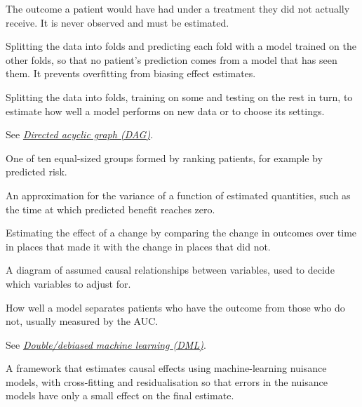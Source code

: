 \begin{description}[style=nextline, leftmargin=1.2em, itemsep=3pt, font=\normalfont\bfseries]
\item[Counterfactual (potential outcome)]
The outcome a patient would have had under a treatment they did not actually receive. It is never observed and must be estimated.

\item[Cross-fitting]
Splitting the data into folds and predicting each fold with a model trained on the other folds, so that no patient's prediction comes from a model that has seen them. It prevents overfitting from biasing effect estimates.

\item[Cross-validation]
Splitting the data into folds, training on some and testing on the rest in turn, to estimate how well a model performs on new data or to choose its settings.

\item[DAG]
See \emph{\hyperref[gl:dag]{Directed acyclic graph (DAG)}}.

\item[Decile]
One of ten equal-sized groups formed by ranking patients, for example by predicted risk.

\item[Delta method]
An approximation for the variance of a function of estimated quantities, such as the time at which predicted benefit reaches zero.

\item[Difference-in-differences]
Estimating the effect of a change by comparing the change in outcomes over time in places that made it with the change in places that did not.

\item[Directed acyclic graph (DAG)]\label{gl:dag}
A diagram of assumed causal relationships between variables, used to decide which variables to adjust for.

\item[Discrimination]
How well a model separates patients who have the outcome from those who do not, usually measured by the AUC.

\item[DML]
See \emph{\hyperref[gl:dml]{Double/debiased machine learning (DML)}}.

\item[Double/debiased machine learning (DML)]\label{gl:dml}
A framework that estimates causal effects using machine-learning nuisance models, with cross-fitting and residualisation so that errors in the nuisance models have only a small effect on the final estimate.


\end{description}
